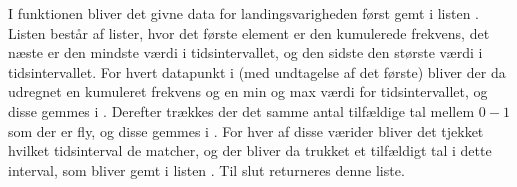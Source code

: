 I funktionen bliver det givne data for landingsvarigheden først gemt i listen . Listen  består af lister, hvor det første element er den kumulerede frekvens, det næste er den mindste værdi i tidsintervallet, og den sidste den største værdi i tidsintervallet.
For hvert datapunkt i  (med undtagelse af det første) bliver der da udregnet en kumuleret frekvens og en min og max værdi for tidsintervallet, og disse gemmes i . 
Derefter trækkes der det samme antal tilfældige tal mellem $0-1$ som der er fly, og disse gemmes i .
For hver af disse værider bliver det tjekket hvilket tidsinterval de matcher, og der bliver da trukket et tilfældigt tal i dette interval, som bliver gemt i listen .
Til slut returneres denne liste.
